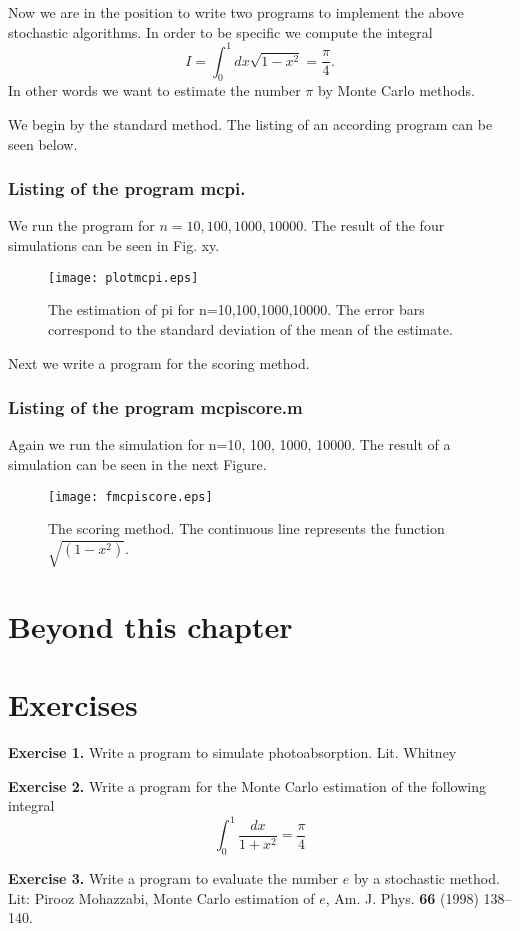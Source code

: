 Now we are in the position to write two programs to implement the above
stochastic algorithms. In order to be specific we compute the integral
\begin{equation}
I = \int_0^1 dx \sqrt{1-x^2} = \frac{\pi}{4}.
\end{equation}
In other words we want to estimate the number $\pi$ by Monte Carlo
methods.

We begin by the standard method. The listing of an according 
program can be seen below.

\subsubsection{Listing of the program mcpi.}

We run the program for $n=10, 100, 1000, 10000$. The result of the 
four simulations can be seen in Fig. xy.
\begin{figure}
\texttt{[image: plotmcpi.eps]}
\caption{The estimation of pi for n=10,100,1000,10000. The 
error bars correspond to the standard deviation of the mean of the 
estimate.}
\end{figure}

Next we write a program for the scoring  method. 

\subsubsection{Listing of the program mcpiscore.m}

Again we run the simulation for n=10, 100, 1000, 10000.
The result of a simulation can be seen in the next Figure.
\begin{figure}
\texttt{[image: fmcpiscore.eps]}
\caption{The scoring method. The continuous line represents
the function $\sqrt{(1-x^2)}$.}
\end{figure}


\section{Beyond this chapter}


\section{Exercises}
{\bf Exercise 1.} Write a program to simulate photoabsorption.
    Lit. Whitney

{\bf Exercise 2.} Write a program for the Monte Carlo estimation of
the following integral
\begin{equation}
\int_0^1\frac{dx}{1+x^2} = \frac{\pi}{4}
\end{equation}

{\bf Exercise 3.} Write a program to evaluate the number $e$ by a
stochastic method.
Lit: Pirooz Mohazzabi, Monte Carlo estimation of $e$,
Am. J. Phys. {\bf 66} (1998) 138--140.




